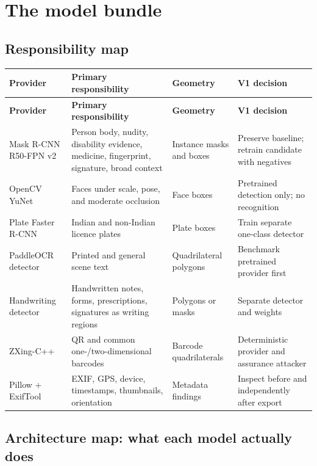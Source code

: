 \chapter{The model bundle}

\section{Responsibility map}

\begin{longtable}{@{}L{31mm}L{43mm}L{35mm}L{35mm}@{}}
\toprule
\textbf{Provider} & \textbf{Primary responsibility} & \textbf{Geometry} & \textbf{V1 decision} \\
\midrule
\endfirsthead
\toprule
\textbf{Provider} & \textbf{Primary responsibility} & \textbf{Geometry} & \textbf{V1 decision} \\
\midrule
\endhead
Mask R-CNN R50-FPN v2 & Person body, nudity, disability evidence, medicine, fingerprint, signature, broad context & Instance masks and boxes & Preserve baseline; retrain candidate with negatives \\
OpenCV YuNet & Faces under scale, pose, and moderate occlusion & Face boxes & Pretrained detection only; no recognition \\
Plate Faster R-CNN & Indian and non-Indian licence plates & Plate boxes & Train separate one-class detector \\
PaddleOCR detector & Printed and general scene text & Quadrilateral polygons & Benchmark pretrained provider first \\
Handwriting detector & Handwritten notes, forms, prescriptions, signatures as writing regions & Polygons or masks & Separate detector and weights \\
ZXing-C++ & QR and common one-/two-dimensional barcodes & Barcode quadrilaterals & Deterministic provider and assurance attacker \\
Pillow + ExifTool & EXIF, GPS, device, timestamps, thumbnails, orientation & Metadata findings & Inspect before and independently after export \\
\bottomrule
\end{longtable}

\section{Architecture map: what each model actually does}

